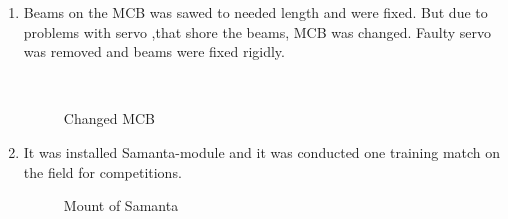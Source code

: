 \begin{enumerate}
	\item Beams on the MCB was sawed to needed length and were fixed. But due to problems with servo ,that shore the beams, MCB was changed. Faulty servo was removed and beams were fixed rigidly.
	\begin{figure}[H]
		\begin{minipage}[h]{0.2\linewidth}
			\center  
		\end{minipage}
		\begin{minipage}[h]{0.6\linewidth}
			\caption{Changed MCB}
		\end{minipage}
	\end{figure}
	
	\item It was installed Samanta-module and it was conducted one training match on the field for competitions.
	
	\begin{figure}[H]
		\begin{minipage}[h]{1\linewidth}
		\end{minipage}
		\caption{Mount of Samanta}
	\end{figure}
	 	
\end{enumerate}
\fillpage